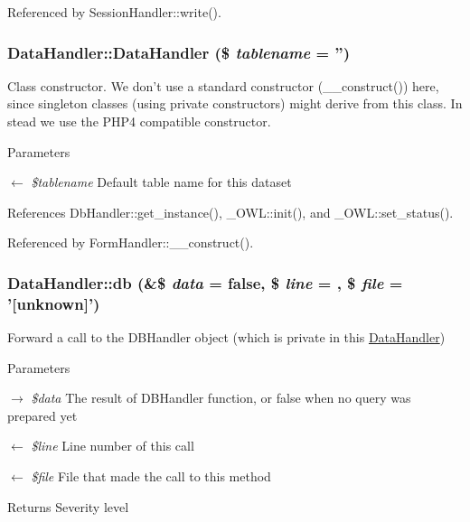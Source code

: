 Referenced by SessionHandler::write().

\subsubsection[{DataHandler}]{\setlength{\rightskip}{0pt plus 5cm}DataHandler::DataHandler (\$ {\em tablename} = {\ttfamily ''})}\label{classDataHandler_aed5b2eb4ca7b2e4b0c1563d817d73c16}
Class constructor. We don't use a standard constructor (\_\-\_\-construct()) here, since singleton classes (using private constructors) might derive from this class. In stead we use the PHP4 compatible constructor. 
\begin{DoxyParams}{Parameters}
\item[\mbox{$\leftarrow$} {\em \$tablename}]Default table name for this dataset \end{DoxyParams}


References DbHandler::get\_\-instance(), \_\-OWL::init(), and \_\-OWL::set\_\-status().



Referenced by FormHandler::\_\-\_\-construct().

\subsubsection[{db}]{\setlength{\rightskip}{0pt plus 5cm}DataHandler::db (\&\$ {\em data} = {\ttfamily false}, \/  \$ {\em line} = {}, \/  \$ {\em file} = {\ttfamily '\mbox{[}unknown\mbox{]}'})}\label{classDataHandler_abb329fe5a97eb8df928aabfc8078ff23}
Forward a call to the DBHandler object (which is private in this \hyperlink{classDataHandler}{DataHandler})


\begin{DoxyParams}{Parameters}
\item[\mbox{$\rightarrow$} {\em \$data}]The result of DBHandler function, or false when no query was prepared yet \item[\mbox{$\leftarrow$} {\em \$line}]Line number of this call \item[\mbox{$\leftarrow$} {\em \$file}]File that made the call to this method \end{DoxyParams}
\begin{DoxyReturn}{Returns}
Severity level 
\end{DoxyReturn}


